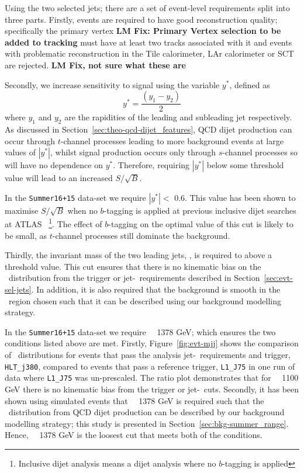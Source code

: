 Using the two selected jets; there are a set of event-level requirements
split into three parts.
Firstly, events are required to have good reconstruction quality;
specifically the primary vertex \textbf{LM Fix: Primary Vertex selection to be added to tracking}
must have at least two tracks associated with it
and events with problematic reconstruction in the Tile calorimeter, LAr calorimeter or SCT are rejected.
\textbf{LM Fix, not sure what these are}

\noindent
Secondly, we increase sensitivity to signal using the 
variable $y^*$, defined as
\begin{equation}
  y^* = \frac{(y_1-y_2)}{2}
\end{equation}
where $y_1$ and $y_2$ are the rapidities of the leading and subleading jet respectively.
As discussed in Section~\ref{sec:theo-qcd-dijet_features}, QCD dijet production can occur through $t$-channel processes leading to more background events at large values of $|y^*|$,
whilst signal production occurs only through $s$-channel processes so will have no dependence on $y^*$.
Therefore, requiring $|y^*|$ below some threshold value will lead to an increased $S/\sqrt{B}$.

In the \verb|Summer16+15| data-set we require $|y^*| <$ 0.6.
This value has been shown to maximise $S/\sqrt{B}$ when no $b$-tagging is applied
at previous inclusive dijet searches at ATLAS~\cite{dijet-mori16_paper}
\footnote{Inclusive dijet analysis means a dijet analysis where no $b$-tagging is applied}.
The effect of $b$-tagging on the optimal value of this cut is likely to be small,
as $t$-channel processes still dominate the background.

Thirdly, the invariant mass of the two leading jets, \mjj, is required to above a threshold value.
This cut ensures that there is no kinematic bias on the \mjj~distribution
from the trigger or jet-\pT~requirements described in Section~\ref{sec:evt-sel-jets}.
In addition, it is also required that the background is smooth in the \mjj~region chosen
such that it can be described using our background modelling strategy.

In the \verb|Summer16+15| data-set we require \mjj~\gt~1378 GeV;
which ensures the two conditions listed above are met.
Firstly, Figure~\ref{fig:evt-mjj} shows the comparison of \mjj~distributions for events
that pass the analysis jet-\pT~requirements and  trigger, \verb|HLT_j380|, compared to events that pass a reference trigger, \verb|L1_J75|
in one run of data where \verb|L1_J75| was un-prescaled.
The ratio plot demonstrates that for \mjj~\gt~1100 GeV there is no kinematic bias from the trigger or jet-\pT~cuts.
Secondly, it has been shown using simulated events that
\mjj~\gt~1378 GeV is required such that the \mjj~distribution from QCD dijet production
can be described by our background modelling strategy;
this study is presented in Section~\ref{sec:bkg-summer_range}.
Hence, \mjj~\gt~1378 GeV is the loosest cut that meets both of the conditions.

